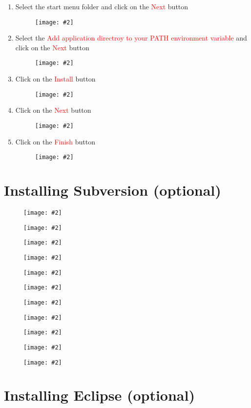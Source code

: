 \documentclass[a4paper]{article}
\newcommand{\FIG}[2]
{
	\begin{figure}[ht!]
	\centering
	\texttt{[image: \#2]}
	\end{figure}
}
\newcommand{\FIGUREB}[1]{\FIG{0.26}{#1}}
\newcommand{\RED}[1] {\textcolor{red}{#1}}
\begin{document}
\begin{enumerate}
\clearpage

\item Select the start menu folder and click on the \RED{Next} button
\FIGUREB{GNUPlot-12.png.eps}

\item Select the
\RED{Add application directroy to your PATH environment variable} and click on
the \RED{Next} button
\FIGUREB{GNUPlot-13.png.eps}

\clearpage

\item Click on the \RED{Install} button
\FIGUREB{GNUPlot-14.png.eps}

\item Click on the \RED{Next} button
\FIGUREB{GNUPlot-15.png.eps}

\clearpage

\item Click on the \RED{Finish} button
\FIGUREB{GNUPlot-16.png.eps}

\end{enumerate}

\clearpage

\section{Installing Subversion (optional)}

\FIGUREB{subversion-1.png.eps}
\FIGUREB{subversion-2.png.eps}
\FIGUREB{subversion-3.png.eps}
\FIGUREB{subversion-4.png.eps}
\FIGUREB{subversion-5.png.eps}
\FIGUREB{subversion-6.png.eps}
\FIGUREB{subversion-7.png.eps}
\FIGUREB{subversion-8.png.eps}
\FIGUREB{subversion-9.png.eps}
\FIGUREB{subversion-10.png.eps}
\FIGUREB{subversion-11.png.eps}

\clearpage

\section{Installing Eclipse (optional)}
\end{document}
